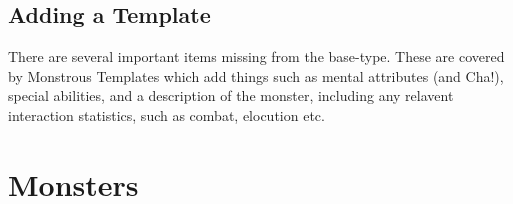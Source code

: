 \documentclass[twoside]{book}
\begin{document}
    

\subsection{Adding a Template}
    
    {  
    There are several important items missing from the base-type. These are covered by Monstrous Templates which add things such as mental attributes (and Cha!), special abilities, and a description of the monster, including any relavent interaction statistics, such as combat, elocution etc.
    }
  
    

\section{Monsters}
    
\end{document}
